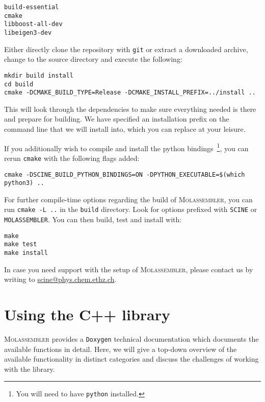 \documentclass[]{tufte-book}
\begin{document}
\begin{Verbatim}
build-essential
cmake
libboost-all-dev
libeigen3-dev
\end{Verbatim}

Either directly clone the repository with \texttt{git} or extract a downloaded
archive, change to the source directory and execute the following:

\begin{Verbatim}
mkdir build install
cd build
cmake -DCMAKE_BUILD_TYPE=Release -DCMAKE_INSTALL_PREFIX=../install ..
\end{Verbatim}

This will look through the dependencies to make sure everything needed is there
and prepare for building. We have specified an installation prefix on the
command line that we will install into, which you can replace at your leisure.

If you additionally wish to compile and install the python
bindings~\footnote{You will need to have \texttt{python} installed.}, you can
rerun \texttt{cmake} with the following flags added:

\begin{Verbatim}
cmake -DSCINE_BUILD_PYTHON_BINDINGS=ON -DPYTHON_EXECUTABLE=$(which python3) ..
\end{Verbatim}

For further compile-time options regarding the build of \textsc{Molassembler},
you can run \texttt{cmake -L ..} in the \texttt{build} directory. Look for
options prefixed with \texttt{SCINE} or \texttt{MOLASSEMBLER}. You can then
build, test and install with:

\begin{Verbatim}
make
make test
make install
\end{Verbatim}

In case you need support with the setup of \textsc{Molassembler}, please contact
us by writing to \href{mailto:scine@phys.chem.ethz.ch}{scine@phys.chem.ethz.ch}.


\chapter{Using the C++ library}

\textsc{Molassembler} provides a \texttt{Doxygen} technical documentation which
documents the available functions in detail. Here, we will give a top-down
overview of the available functionality in distinct categories and discuss the
challenges of working with the library.
\end{document}
